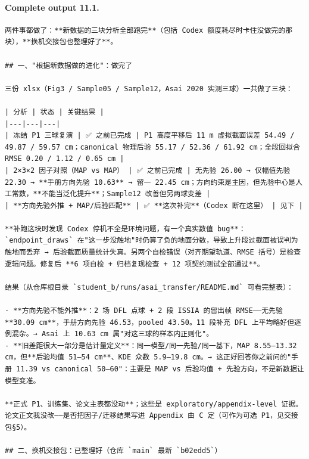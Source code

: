 \documentclass[UTF8,10pt]{ctexart}
\begin{document}
\paragraph{Complete output 11.1.}
\begin{Verbatim}[breaklines=true,breakanywhere=true,fontsize=\scriptsize,frame=single,framesep=2pt]
两件事都做了：**新数据的三块分析全部跑完**（包括 Codex 额度耗尽时卡住没做完的那块），**换机交接包也整理好了**。

## 一、"根据新数据做的进化"：做完了

三份 xlsx（Fig3 / Sample05 / Sample12，Asai 2020 实测三球）一共做了三块：

| 分析 | 状态 | 关键结果 |
|---|---|---|
| 冻结 P1 三球复演 | ✅ 之前已完成 | P1 高度平移后 11 m 虚拟截面误差 54.49 / 49.87 / 59.57 cm；canonical 物理后验 55.17 / 52.36 / 61.92 cm；全段回拟合 RMSE 0.20 / 1.12 / 0.65 cm |
| 2×3×2 因子对照（MAP vs MAP） | ✅ 之前已完成 | 无先验 26.00 → 仅幅值先验 22.30 → **手册方向先验 10.63** → 留一 22.45 cm；方向约束是主因，但先验中心是人工常数，**不能当泛化提升**；Sample12 改善但另两球变差 |
| **方向先验外推 + MAP/后验匹配** | ✅ **这次补完**（Codex 断在这里） | 见下 |

**补跑这块时发现 Codex 停机不全是环境问题，有一个真实数值 bug**：`endpoint_draws` 在"这一步没触地"时仍算了负的地面分数，导致上升段过截面被误判为触地而丢弃 → 后验截面质量统计失真。另两个自检错误（对齐期望轨道、RMSE 括号）是检查逻辑问题。修复后 **6 项自检 + 归档复现检查 + 12 项契约测试全部通过**。

结果（从仓库根目录 `student_b/runs/asai_transfer/README.md` 可看完整表）：

- **方向先验不能外推**：2 场 DFL 点球 + 2 段 ISSIA 的留出帧 RMSE——无先验 **30.09 cm**，手册方向先验 46.53，pooled 43.50。11 段补充 DFL 上平均略好但逐例混杂。→ Asai 上 10.63 cm 属"对这三球的样本内正则化"。
- **旧差距很大一部分是估计量定义**：同一模型/同一先验/同一基下，MAP 8.55–13.32 cm，但**后验均值 51–54 cm**、KDE 众数 5.9–19.8 cm。→ 这正好回答你之前问的"手册 11.39 vs canonical 50–60"：主要是 MAP vs 后验均值 + 先验方向，不是新数据让模型变准。

**正式 P1、训练集、论文主表都没动**；这些是 exploratory/appendix-level 证据。论文正文我没改——是否把因子/迁移结果写进 Appendix 由 C 定（可作为可选 P1，见交接包§5）。

## 二、换机交接包：已整理好（仓库 `main` 最新 `b02edd5`）


\end{Verbatim}
\end{document}
